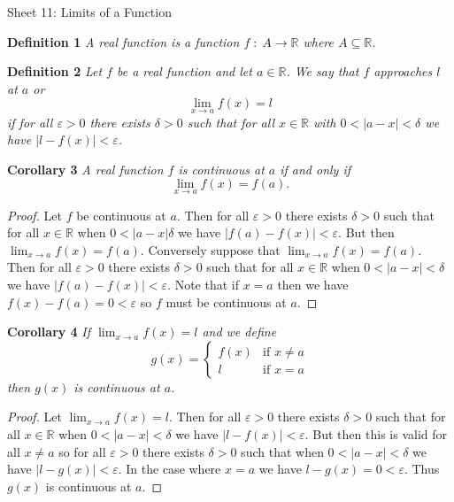 \documentclass{article}
\begin{document}
\begin{flushleft}

\Large

Sheet 11: Limits of a Function\newline

\normalsize

\textbf{Definition 1}
\textsl{A real function is a function $f \; : \; A \rightarrow \mathbb{R}$ where $A \subseteq \mathbb{R}$.}\newline

\textbf{Definition 2}
\textsl{Let $f$ be a real function and let $a \in \mathbb{R}$. We say that $f$ approaches $l$ at $a$ or
\[
\lim_{x \rightarrow a} f(x) = l
\]
if for all $\varepsilon > 0$ there exists $\delta > 0$ such that for all $x \in \mathbb{R}$ with $0 < |a-x| < \delta$ we have $|l - f(x)| < \varepsilon$.}\newline

\textbf{Corollary 3}
\textsl{A real function $f$ is continuous at $a$ if and only if
\[
\lim_{x \rightarrow a} f(x) = f(a).
\]}
\begin{proof}
Let $f$ be continuous at $a$. Then for all $\varepsilon > 0$ there exists $\delta > 0$ such that for all $x \in \mathbb{R}$ when $0 < |a - x| \delta$ we have $|f(a) - f(x)| < \varepsilon$. But then $\lim_{x \rightarrow a} f(x) = f(a)$. Conversely suppose that $\lim_{x \rightarrow a} f(x) = f(a)$. Then for all $\varepsilon > 0$ there exists $\delta > 0$ such that for all $x \in \mathbb{R}$ when $0 < |a-x| < \delta$ we have $|f(a)-f(x)| < \varepsilon$. Note that if $x=a$ then we have $f(x)-f(a) = 0 < \varepsilon$ so $f$ must be continuous at $a$.
\end{proof}

\textbf{Corollary 4}
\textsl{If $\lim_{x \rightarrow a} f(x) = l$ and we define
\[
g(x)=
\begin{cases}
f(x) & \text{if } x \neq a\\
l & \text{if } x = a
\end{cases}
\]
then $g(x)$ is continuous at $a$.}
\begin{proof}
Let $\lim_{x \rightarrow a} f(x) = l$. Then for all $\varepsilon > 0$ there exists $\delta > 0$ such that for all $x \in \mathbb{R}$ when $0 < |a-x| < \delta$ we have $|l - f(x)| < \varepsilon$. But then this is valid for all $x \neq a$ so for all $\varepsilon > 0$ there exists $\delta > 0$ such that when $0 < |a-x| < \delta$ we have $|l - g(x)| < \varepsilon$. In the case where $x=a$ we have $l-g(x) = 0 < \varepsilon$. Thus $g(x)$ is continuous at $a$.
\end{proof}


\end{flushleft}
\end{document}
